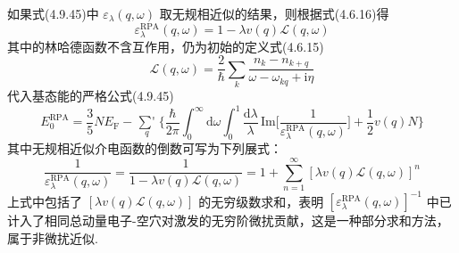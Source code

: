 如果式(4.9.45)中 $\varepsilon_{\lambda}(q,\omega)$ 取无规相近似的结果，则根据式(4.6.16)得
\begin{equation}
  \varepsilon_{\lambda}^{\mathrm{RPA}}(q,\omega)
  =1-\lambda v(q)\mathcal{L}(q,\omega)
\end{equation}
其中的林哈德函数不含互作用，仍为初始的定义式(4.6.15)
\begin{equation}
  \mathcal{L}(q,\omega)=\frac{2}{\hbar}\sum_{k}
  \frac{n_{k}-n_{k+q}}{\omega-\omega_{kq}+\mathrm{i}\eta}
\end{equation}
代入基态能的严格公式(4.9.45)
\begin{equation}
  E_{0}^{\mathrm{RPA}}=\frac{3}{5}NE_{\mathrm{F}}-\mathop{{\sum}'}\limits_{q}
  \bigg\{\frac{\hbar}{2\pi}\int_{0}^{\infty}\mathrm{d}\omega
  \int_{0}^{1}\frac{\mathrm{d}\lambda}{\lambda}\,
  \mathrm{Im}\bigg[\frac{1}{\varepsilon_{\lambda}^{\mathrm{RPA}}(q,\omega)}\bigg]
  +\frac{1}{2}v(q)N\bigg\}
\end{equation}
其中无规相近似介电函数的倒数可写为下列展式：
\begin{equation}
  \frac{1}{\varepsilon_{\lambda}^{\mathrm{RPA}}(q,\omega)}
  =\frac{1}{1-\lambda v(q)\mathcal{L}(q,\omega)}
  =1+\sum_{n=1}^{\infty}
  \left[\lambda v(q)\mathcal{L}(q,\omega)\right]^{n}
\end{equation}
上式中包括了 $\left[\lambda v(q)\mathcal{L}(q,\omega)\right]$ 的无穷级数求和，表明
$\left[\varepsilon_{\lambda}^{\mathrm{RPA}}(q,\omega)\right]^{-1}$ 中已计入了相同总动量电子-空穴对激发的无穷阶微扰贡献，这是一种部分求和方法，属于非微扰近似.

